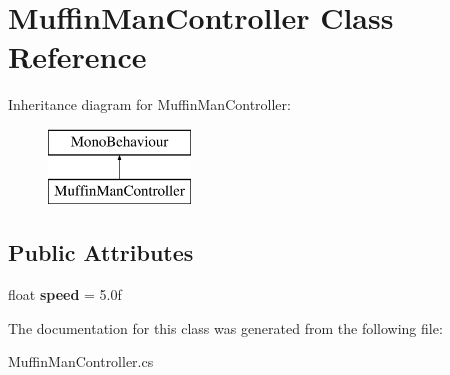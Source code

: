 \hypertarget{class_muffin_man_controller}{}\section{Muffin\+Man\+Controller Class Reference}
\label{class_muffin_man_controller}
Inheritance diagram for Muffin\+Man\+Controller\+:\begin{figure}[H]
\begin{center}
\leavevmode
\includegraphics[height=2.000000cm]{class_muffin_man_controller}
\end{center}
\end{figure}
\subsection*{Public Attributes}
\begin{DoxyCompactItemize}
\item 
\mbox{\label{class_muffin_man_controller_af5afb2b3cd19f7628413bc563b078bf7}} 
float {\bfseries speed} = 5.\+0f
\end{DoxyCompactItemize}


The documentation for this class was generated from the following file\+:\begin{DoxyCompactItemize}
\item 
Muffin\+Man\+Controller.\+cs\end{DoxyCompactItemize}
